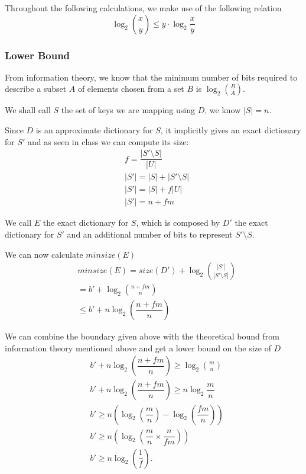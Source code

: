 \documentclass{article}
\begin{document}
Throughout the following calculations, we make use of the following relation
\[ \log_2 \binom{x}{y} \leq y \cdot \log_2 \dfrac{x}{y} \]

\subsubsection*{Lower Bound}
From information theory, we know that the minimum number of bits required to describe a subset \(A\) of
elements chosen from a set \(B\) is \( \log_2 \binom{B}{A} \).

We shall call \(S\) the set of keys we are mapping using \(D\), we know \( |S| = n \).

Since \(D\) is an approximate dictionary for \(S\), it implicitly gives an exact dictionary
for \(S'\) and as seen in class we can compute its size:
\[
	\begin{aligned}
		&f = \dfrac{|S' \setminus S|}{|U|} \\
		&|S'| = |S| + |S' \setminus S| \\
		&|S'| = |S| + f|U| \\
		&|S'| = n+fm
	\end{aligned}
\]

We call \(E\) the exact dictionary for \(S\), which is composed by \(D'\) the exact dictionary for \(S'\)
and an additional number of bits to represent \(S' \setminus S\).

We can now calculate \(minsize(E)\)
\[
	\begin{aligned}
		& minsize(E) = size(D') + \log_2 \binom{|S'|}{|S' \setminus S|} \\
		&=  b' + \log_2 \binom{n+fm}{n} \\
		&\leq b' + n \log_2\left(\dfrac{n+fm}{n}\right)
	\end{aligned}
\]

We can combine the boundary given above with the theoretical bound from information theory mentioned
above and get a lower bound on the size of \(D\)
\[
	\begin{aligned}
		& b' + n \log_2\left(\dfrac{n+fm}{n}\right) \geq \log_2 \binom{m}{n} \\
		& b' + n \log_2\left(\dfrac{n+fm}{n}\right) \geq n \log_2 \dfrac{m}{n} \\
		& b' \geq n \left( \log_2\left(\dfrac{m}{n}\right) - \log_2\left(\dfrac{fm}{n}\right) \right) \\
		& b' \geq n \left( \log_2\left(\dfrac{m}{n} \times \dfrac{n}{fm}\right) \right) \\
		& b' \geq n \log_2\left(\dfrac{1}{f}\right).
	\end{aligned}
\]
\end{document}
